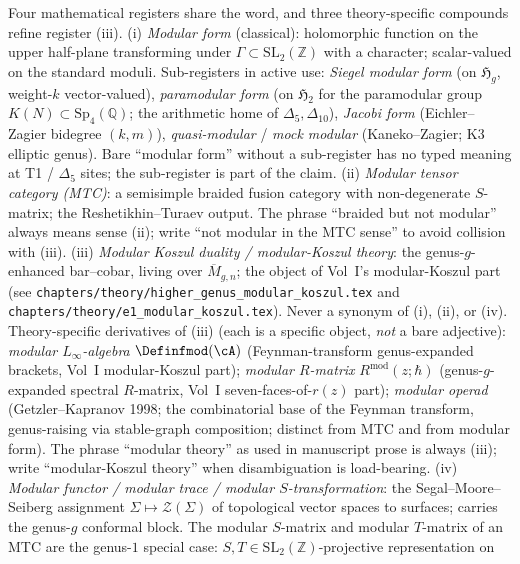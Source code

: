 \begin{description}[itemsep=4pt, leftmargin=2.0em, style=nextline]
\item[T15 (``modular''--four registers plus three theory-specific
derivatives).]
%
Four mathematical registers share the word, and three theory-specific
compounds refine register (iii).
(i) \emph{Modular form} (classical): holomorphic function on the
upper half-plane transforming under $\Gamma \subset
\mathrm{SL}_2(\mathbb Z)$ with a character; scalar-valued on the
standard moduli. Sub-registers in active use: \emph{Siegel modular
form} (on $\mathfrak H_g$, weight-$k$ vector-valued), \emph{paramodular
form} (on $\mathfrak H_2$ for the paramodular group $K(N)
\subset \mathrm{Sp}_4(\mathbb Q)$; the arithmetic home of $\Delta_5,
\Delta_{10}$), \emph{Jacobi form} (Eichler--Zagier bidegree $(k, m)$),
\emph{quasi-modular} / \emph{mock modular} (Kaneko--Zagier; K3 elliptic
genus). Bare ``modular form'' without a sub-register has no typed
meaning at T1 / $\Delta_5$ sites; the sub-register is part of the
claim.
(ii) \emph{Modular tensor category (MTC)}: a semisimple braided
fusion category with non-degenerate $S$-matrix; the Reshetikhin--Turaev
output. The phrase ``braided but not modular'' always means sense (ii);
write ``not modular in the MTC sense'' to avoid collision with (iii).
(iii) \emph{Modular Koszul duality / modular-Koszul theory}: the
genus-$g$-enhanced bar--cobar, living over
$\overline{M}_{g,n}$; the object of Vol~I's modular-Koszul part
(see \texttt{chapters/theory/higher\_genus\_modular\_koszul.tex}
and \texttt{chapters/theory/e1\_modular\_koszul.tex}). Never a
synonym of (i), (ii), or (iv). Theory-specific derivatives of
(iii) (each is a specific object, \emph{not} a bare adjective):
\emph{modular $L_\infty$-algebra} $\Definfmod(\cA)$ (Feynman-transform
genus-expanded brackets, Vol~I modular-Koszul part); \emph{modular $R$-matrix}
$R^{\mathrm{mod}}(z;\hbar)$ (genus-$g$-expanded spectral $R$-matrix,
Vol~I seven-faces-of-$r(z)$ part); \emph{modular operad} (Getzler--Kapranov 1998;
the combinatorial base of the Feynman transform, genus-raising via
stable-graph composition; distinct from MTC and from modular form).
The phrase ``modular theory'' as used in manuscript prose is always
(iii); write ``modular-Koszul theory''
when disambiguation is load-bearing.
(iv) \emph{Modular functor / modular trace / modular
$S$-transformation}: the
Segal--Moore--Seiberg assignment $\Sigma \mapsto
\mathcal Z(\Sigma)$ of topological vector spaces to surfaces;
carries the genus-$g$ conformal block. The modular $S$-matrix and
modular $T$-matrix of an MTC are the genus-$1$ special case:
$S, T \in \mathrm{SL}_2(\mathbb Z)$-projective representation on

\end{description}

